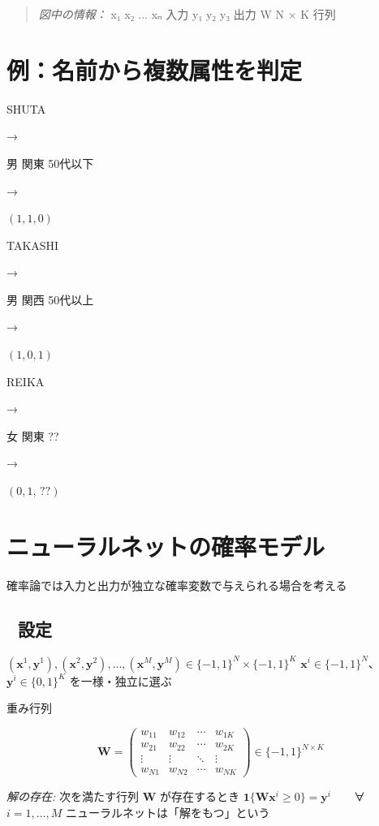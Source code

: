 \documentclass[uplatex,dvipdfmx,11pt,a4paper,openany]{bxjsbook}
\newenvironment{figuretext}{\begin{quote}\small\color{black!65}\emph{図中の情報：}}{\end{quote}}
\begin{document}
\begin{figuretext}
x₁ \quad x₂ \quad ... \quad xₙ \quad 入力 \quad y₁ \quad y₂ \quad y₃ \quad 出力 \quad W \quad N × K 行列
\end{figuretext}

\section{例：名前から複数属性を判定}
SHUTA

→

男
関東
50代以下

→

\( (1, 1, 0) \)

TAKASHI

→

男
関西
50代以上

→

\( (1, 0, 1) \)

REIKA

→

女
関東
??

→

\( (0, 1, \, ??) \)

\section{ニューラルネットの確率モデル}
確率論では入力と出力が独立な確率変数で与えられる場合を考える

\subsection{📐 設定}
\( (\mathbf{x}^1, \mathbf{y}^1), (\mathbf{x}^2, \mathbf{y}^2), \ldots, (\mathbf{x}^M, \mathbf{y}^M) \in \{-1, 1\}^N \times \{-1, 1\}^K \)\allowbreak{} 
\( \mathbf{x}^i \in \{-1,1\}^N \)、\( \mathbf{y}^i \in \{0,1\}^K \) を一様・独立に選ぶ

重み行列

\[ \mathbf{W} = \begin{pmatrix} w_{11} & w_{12} & \cdots & w_{1K} \\ w_{21} & w_{22} & \cdots & w_{2K} \\ \vdots & \vdots & \ddots & \vdots \\ w_{N1} & w_{N2} & \cdots & w_{NK} \end{pmatrix}  \in \{-1, 1\}^{N \times K} \]

\emph{解の存在:} 次を満たす行列 \( \mathbf{W} \) が存在するとき\allowbreak{} 
\( \mathbf{1}\{ \mathbf{W}\mathbf{x}^i \ge 0 \} = \mathbf{y}^i \)　　∀ \( i = 1, \ldots, M \)\allowbreak{} 
            ニューラルネットは「解をもつ」という
\end{document}
